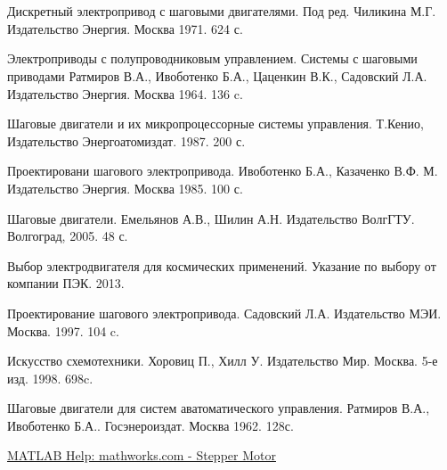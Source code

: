 \newpage
\section[Список использованной литературы]{}
\begin{thebibliography}{30}

     Дискретный электропривод с шаговыми двигателями.
                        Под ред. Чиликина М.Г.
                        Издательство Энергия. Москва 1971. 624 с.

     Электроприводы с полупроводниковым управлением. Системы с шаговыми приводами
                                    Ратмиров В.А., Ивоботенко Б.А., Цаценкин В.К., Садовский Л.А.
                                    Издательство Энергия. Москва 1964. 136 c.

     Шаговые двигатели и их микропроцессорные системы управления.
                    Т.Кенио,
                    Издательство Энергоатомиздат. 1987. 200 с.

     Проектировани шагового электропривода.
                                   Ивоботенко Б.А., Казаченко В.Ф. М.
                                   Издательство Энергия. Москва 1985. 100 с.

     Шаговые двигатели.
                              Емельянов А.В., Шилин А.Н.
                              Издательство ВолгГТУ. Волгоград, 2005. 48 с.

     Выбор электродвигателя для космических применений.
                                    Указание по выбору от компании ПЭК. 2013.

     Проектирование шагового электропривода.
                        Садовский Л.А. 
                        Издательство МЭИ. Москва. 1997. 104 c.

     Искусство схемотехники.
                          Хоровиц П., Хилл У.
                          Издательство Мир. Москва. 5-е изд. 1998. 698c.

     Шаговые двигатели для систем аватоматического управления.
                                                Ратмиров В.А., Ивоботенко Б.А..
                                                Госэнероиздат. Москва 1962. 128с.

     \href{http://www.mathworks.com/help/physmod/sps/powersys/ref/steppermotor.html}
                                            {MATLAB Help: mathworks.com - Stepper Motor}


\end{thebibliography}

